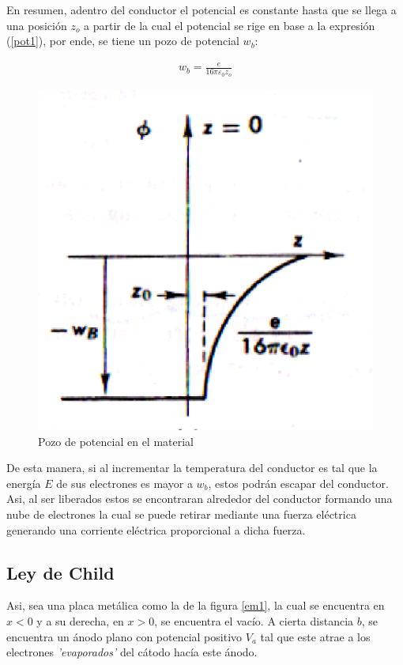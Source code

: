 \documentclass[%
 reprint,
 amsmath,amssymb,
 aps,
]{revtex4-2}
\begin{document}
\vspace{0.2 cm}
En resumen, adentro del conductor el potencial es constante hasta que se llega a una posición $z_o$ a partir de la cual el potencial se rige en base a la expresión (\ref{pot1}), por ende, se tiene un pozo de potencial $w_b$:

\begin{align*}
    w_b = \frac{e}{16\pi \varepsilon_{0}z_o}
\end{align*}

\begin{figure}[H]
    \centering
    \includegraphics[width=0.7\linewidth]{imagenes/pozo.png}
    \caption{Pozo de potencial en el material}
    \label{fig:enter-label}
\end{figure}

\vspace{0.2 cm}
De esta manera, si al incrementar la temperatura del conductor es tal que la energía $E$ de sus electrones es mayor a $w_b$, estos podrán escapar del conductor. Asi, al ser liberados estos se encontraran alrededor del conductor formando una nube de electrones la cual se puede retirar mediante una fuerza eléctrica generando una corriente eléctrica proporcional a dicha fuerza.

\subsection{Ley de Child}
Asi, sea una placa metálica como la de la figura \ref{em1}, la cual se encuentra en $x<0$ y a su derecha, en $x>0$, se encuentra el vacío. A cierta distancia $b$, se encuentra un ánodo plano con potencial positivo $V_{a}$ tal que este atrae a los electrones \textit{'evaporados'} del cátodo hacía este ánodo.
\end{document}
